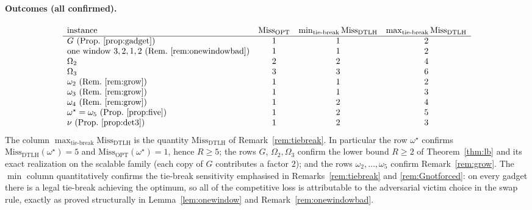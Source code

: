 \documentclass{amsart}
\theoremstyle{definition}
\begin{document}
\paragraph{Outcomes (all confirmed).}
\[
\begin{array}{lccc}
\text{instance} & \mathrm{Miss}_{\mathrm{OPT}} & \min_{\text{tie-break}}\mathrm{Miss}_{\mathrm{DTLH}} & \max_{\text{tie-break}}\mathrm{Miss}_{\mathrm{DTLH}}\\\hline
G\ (\text{Prop.~\ref{prop:gadget}}) & 1 & 1 & 2\\
\text{one window }3,2,1,2\ (\text{Rem.~\ref{rem:onewindowbad}}) & 1 & 1 & 2\\
\Omega_2 & 2 & 2 & 4\\
\Omega_3 & 3 & 3 & 6\\
\omega_2\ (\text{Rem.~\ref{rem:grow}}) & 1 & 1 & 2\\
\omega_3\ (\text{Rem.~\ref{rem:grow}}) & 1 & 1 & 3\\
\omega_4\ (\text{Rem.~\ref{rem:grow}}) & 1 & 2 & 4\\
\omega^\star=\omega_5\ (\text{Prop.~\ref{prop:five}}) & 1 & 2 & 5\\
\nu\ (\text{Prop.~\ref{prop:det3}}) & 1 & 2 & 3
\end{array}
\]
The column $\max_{\text{tie-break}}\mathrm{Miss}_{\mathrm{DTLH}}$ is the quantity
$\mathrm{Miss}_{\mathrm{DTLH}}$ of Remark~\ref{rem:tiebreak}. In particular the
row $\omega^\star$ confirms $\mathrm{Miss}_{\mathrm{DTLH}}(\omega^\star)=5$ and
$\mathrm{Miss}_{\mathrm{OPT}}(\omega^\star)=1$, hence $R\ge5$; the rows $G$,
$\Omega_2,\Omega_3$ confirm the lower bound $R\ge2$ of Theorem~\ref{thm:lb} and
its exact realization on the scalable family (each copy of $G$ contributes a
factor $2$); and the rows $\omega_2,\dots,\omega_5$ confirm
Remark~\ref{rem:grow}. The $\min$ column quantitatively confirms the tie-break
sensitivity emphasised in Remarks~\ref{rem:tiebreak} and \ref{rem:Gnotforced}:
on every gadget there is a legal tie-break achieving the optimum, so all of the
competitive loss is attributable to the adversarial victim choice in the swap
rule, exactly as proved structurally in Lemma~\ref{lem:onewindow} and
Remark~\ref{rem:onewindowbad}.
\end{document}
